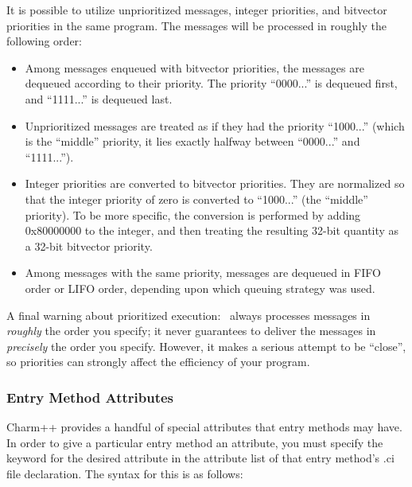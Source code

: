 It is possible to utilize unprioritized messages, integer priorities,
and bitvector priorities in the same program.  The messages will be
processed in roughly the following order:

\begin{itemize}

\item Among messages enqueued with bitvector priorities, the
messages are dequeued according to their priority.  The
priority ``0000...'' is dequeued first, and ``1111...'' is
dequeued last.

\item Unprioritized messages are treated as if they had the
priority ``1000...'' (which is the ``middle'' priority, it
lies exactly halfway between ``0000...'' and ``1111...'').
 
\item Integer priorities are converted to bitvector priorities.  They
are normalized so that the integer priority of zero is converted to
``1000...'' (the ``middle'' priority).  To be more specific, the
conversion is performed by adding 0x80000000 to the integer, and then
treating the resulting 32-bit quantity as a 32-bit bitvector priority.

\item Among messages with the same priority, messages are
dequeued in FIFO order or LIFO order, depending upon which
queuing strategy was used.

\end{itemize} 

A final warning about prioritized execution: \charmpp\ always processes
messages in {\it roughly} the order you specify; it never guarantees to
deliver the messages in {\it precisely} the order you specify.
However, it makes a serious attempt to be ``close'', so priorities
can strongly affect the efficiency of your program.

\subsubsection{Entry Method Attributes}
\label{attributes}

Charm++ provides a handful of special attributes that entry
methods may have.  In order to give a particular entry
method an attribute, you must specify the keyword for the desired attribute in
the attribute list of that entry method's .ci file declaration.  The syntax for
this is as follows:

